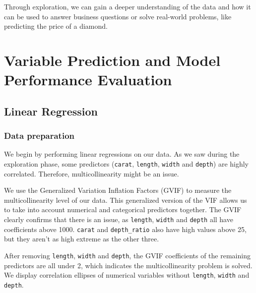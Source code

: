 \documentclass[
  paper=a4,
  ,captions=tableheading
]{scrartcl}
\begin{document}
Through exploration, we can gain a deeper understanding of the data and
how it can be used to answer business questions or solve real-world
problems, like predicting the price of a diamond.

\hypertarget{variable-prediction-and-model-performance-evaluation}{%
\section{Variable Prediction and Model Performance
Evaluation}\label{variable-prediction-and-model-performance-evaluation}}

\hypertarget{linear-regression}{%
\subsection{Linear Regression}\label{linear-regression}}

\hypertarget{data-preparation}{%
\subsubsection{Data preparation}\label{data-preparation}}

We begin by performing linear regressions on our data. As we saw during
the exploration phase, some predictors (\texttt{carat}, \texttt{length},
\texttt{width} and \texttt{depth}) are highly correlated. Therefore,
multicollinearity might be an issue.

We use the Generalized Variation Inflation Factors (GVIF) to measure the
multicollinearity level of our data. This generalized version of the VIF
allows us to take into account numerical and categorical predictors
together. The GVIF clearly confirms that there is an issue, as
\texttt{length}, \texttt{width} and \texttt{depth} all have coefficients
above 1000. \texttt{carat} and \texttt{depth\_ratio} also have high
values above 25, but they aren't as high extreme as the other three.

After removing \texttt{length}, \texttt{width} and \texttt{depth}, the
GVIF coefficients of the remaining predictors are all under 2, which
indicates the multicollinearity problem is solved. We display
correlation ellipses of numerical variables without \texttt{length},
\texttt{width} and \texttt{depth}.
\end{document}
